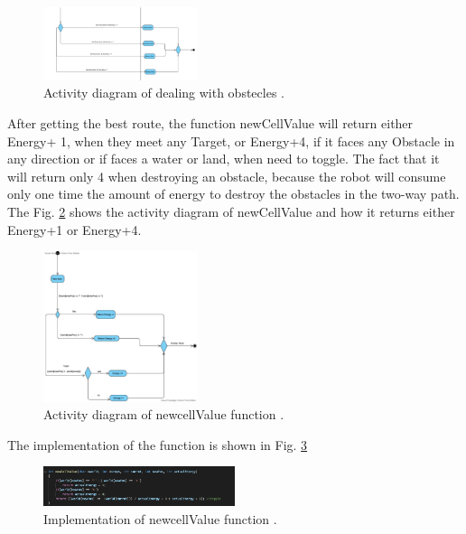\documentclass[10pt,journal,compsoc]{IEEEtran}
\begin{document}
\begin{figure}[!h]
	
	\centering
	\includegraphics[width=0.4\textwidth]{Obstecles.png}
	\caption{\label{ObstAct}Activity diagram of dealing with obstecles  .}
	
\end{figure}


After getting the best route, the function newCellValue will return either Energy+ 1, when they meet any Target, or Energy+4, if  it faces any Obstacle in any direction or if faces a water or land, when need to toggle. The fact that it will return only 4 when destroying an obstacle, because the robot will consume only one time the amount of energy to destroy the obstacles in  the two-way path. The Fig.   \ref{nextstepAct} shows the activity diagram of newCellValue and how it returns either Energy+1 or Energy+4. 

\begin{figure}[!h]
	
	\centering
	\includegraphics[width=0.4\textwidth]{NextStep.png}
	\caption{\label{nextstepAct}Activity diagram of newcellValue function .}
	
\end{figure}



The implementation of the function is shown in Fig. \ref{calCode}


\begin{figure}[!h]
	
	\centering
	\includegraphics[width=0.5\textwidth]{newCalCode.png}
	\caption{\label{calCode} Implementation of newcellValue function .}
	
\end{figure}
\end{document}
